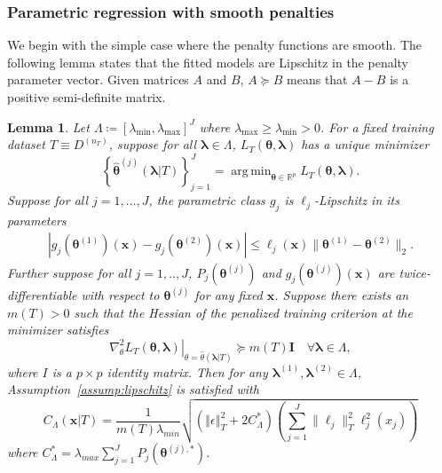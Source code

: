\documentclass[12pt]{article} %
\newtheorem{lemma}{Lemma}
\theoremstyle{definition}
\DeclareMathOperator*{\argmin}{arg\,min}
\begin{document}
\subsubsection{Parametric regression with smooth penalties}
\label{sec:param_smooth}
We begin with the simple case where the penalty functions are smooth. The following lemma states that the fitted models are Lipschitz in the penalty parameter vector.
Given matrices $A$ and $B$, $A \succeq B$ means that $A - B$ is a positive semi-definite matrix.
\begin{lemma}
	\label{lemma:param_add}
	Let $\Lambda \coloneqq \left [ \lambda_{\min}, \lambda_{\max} \right ]^J$ where $\lambda_{\max} \ge \lambda_{\min} > 0$.
	For a fixed training dataset $T \equiv D^{(n_T)}$, suppose for all $\boldsymbol{\lambda} \in \Lambda$, $L_T \left (\boldsymbol{\theta}, \boldsymbol{\lambda} \right)$ has a unique minimizer
	\begin{equation}
	\label{eq:param_add_estimator}
	\left\{
	\hat{\boldsymbol{\theta}}^{(j)}\left (\boldsymbol{\lambda} | T \right )
	\right\}_{j=1}^J =
	\argmin_{\boldsymbol{\theta} \in \mathbb{R}^p} L_T \left (\boldsymbol{\theta}, \boldsymbol{\lambda} \right).
	\end{equation}
	Suppose for all $j = 1,...,J$, the parametric class $g_j$ is $\ell_j$-Lipschitz in its parameters
	\begin{align}
	\left|
	g_j (\boldsymbol{\theta}^{(1)} )(\boldsymbol{x})
	-g_j (\boldsymbol{\theta}^{(2)} )(\boldsymbol{x})
	\right|
	\le
	\ell_j (\boldsymbol{x})
	\|\boldsymbol{\theta}^{(1)}-\boldsymbol{\theta}^{(2)}\|_{2}.
	\end{align}
	Further suppose for all $j=1,..,J$, $P_j(\boldsymbol{\theta}^{(j)})$ and $g_j(\boldsymbol{\theta}^{(j)})(\boldsymbol{x})$ are twice-differentiable with respect to $\boldsymbol{\theta}^{(j)}$ for any fixed $\boldsymbol{x}$.
	Suppose there exists an $m(T) > 0$ such that the Hessian of the penalized training criterion at the minimizer satisfies
	\begin{equation}
	\left . \nabla_{\theta}^2 L_T \left (\boldsymbol{\theta}, \boldsymbol{\lambda} \right) \right |_{\theta = \hat{\theta}(\boldsymbol{\lambda} | T )} \succeq m(T) \boldsymbol{I}
	\quad \forall \boldsymbol{\lambda} \in \Lambda,
	\label{eq:smooth_pos_def}
	\end{equation}
	where $I$ is a $p \times p$ identity matrix.
	Then for any $\boldsymbol{\lambda}^{(1)}, \boldsymbol{\lambda}^{(2)} \in \Lambda$,
	Assumption~\ref{assump:lipschitz} is satisfied with
	\begin{equation}
	\label{eq:param_add_lipschitz}
	C_\Lambda(\boldsymbol{x} | T) =
	\frac{1}{m(T) \lambda_{min}}
	\sqrt{
		\left(
		\left\Vert \epsilon \right \Vert_T^2 + 2 C^*_{\Lambda}
		\right)
		\left(
		\sum_{j=1}^J  \|\ell_j\|_T^2 \ell_j^2(x_j)
		\right)
	}
	\end{equation}
	where $C^*_{\Lambda} = \lambda_{max}\sum_{j=1}^{J} P_{j}(\boldsymbol{\theta}^{(j),*})$.
\end{lemma}
\end{document}
